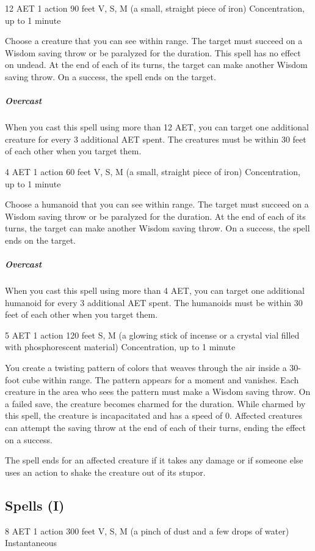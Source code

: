 \label{spell:hold-monster}
{12 AET}
{1 action}
{90 feet}
{V, S, M (a small, straight piece of iron)}
{Concentration, up to 1 minute}

Choose a creature that you can see within range. The target must succeed on a Wisdom saving throw or be paralyzed for the duration. This spell has no effect on undead. At the end of each of its turns, the target can make another Wisdom saving throw. On a success, the spell ends on the target.
\subparagraph*{Overcast} When you cast this spell using more than 12 AET, you can target one additional creature for every 3 additional AET spent. The creatures must be within 30 feet of each other when you target them.

\label{spell:hold-person}
{4 AET}
{1 action}
{60 feet}
{V, S, M (a small, straight piece of iron)}
{Concentration, up to 1 minute}

Choose a humanoid that you can see within range. The target must succeed on a Wisdom saving throw or be paralyzed for the duration. At the end of each of its turns, the target can make another Wisdom saving throw. On a success, the spell ends on the target.
\subparagraph*{Overcast} When you cast this spell using more than 4 AET, you can target one additional humanoid for every 3 additional AET spent. The humanoids must be within 30 feet of each other when you target them.

\label{spell:hypnotic-pattern}
{5 AET}
{1 action}
{120 feet}
{S, M (a glowing stick of incense or a crystal vial filled with phosphorescent material)}
{Concentration, up to 1 minute}

You create a twisting pattern of colors that weaves through the air inside a 30-foot cube within range. The pattern appears for a moment and vanishes. Each creature in the area who sees the pattern must make a Wisdom saving throw. On a failed save, the creature becomes charmed for the duration. While charmed by this spell, the creature is incapacitated and has a speed of 0. Affected creatures can attempt the saving throw at the end of each of their turns, ending the effect on a success.

The spell ends for an affected creature if it takes any damage or if someone else uses an action to shake the creature out of its stupor.

\subsection{Spells (I)}
\label{spell:ice-storm}
{8 AET}
{1 action}
{300 feet}
{V, S, M (a pinch of dust and a few drops of water)}
{Instantaneous}

